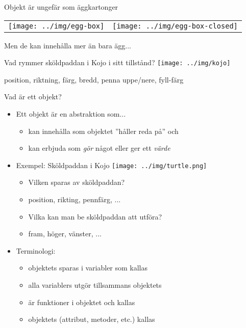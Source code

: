 
\ifkompendium\else
\begin{SlideExtra}{Objekt är ungefär som äggkartonger}
  \begin{tabular}{l r}
    \texttt{[image: ../img/egg-box]}
    &
    \texttt{[image: ../img/egg-box-closed]}
  \end{tabular}
  Men de kan innehålla mer än bara ägg...
\end{SlideExtra}
\fi

\begin{Slide}{Vad rymmer sköldpaddan i Kojo i sitt tillstånd?}
\centering
\texttt{[image: ../img/kojo]}

\pause position, riktning, färg, bredd, penna uppe/nere, fyll-färg
\end{Slide}



\begin{Slide}{Vad är ett objekt?}
\begin{itemize}
\item Ett objekt är en abstraktion som...
\begin{itemize}
  \item kan innehålla  som objektet ''håller reda på'' och
  \item kan erbjuda  som \emph{gör} något eller ger ett \emph{värde}
\end{itemize}

\pause

\item Exempel: Sköldpaddan i Kojo \texttt{[image: ../img/turtle.png]}
\begin{itemize}
  \item Vilken  sparas av sköldpaddan?
  \pause
  \item[] position, rikting, pennfärg, ...

  \item Vilka  kan man be sköldpaddan att utföra?

  \item[] fram, höger, vänster, ...
  \pause


\end{itemize}

\item Terminologi:
\begin{itemize}
  \item objektets  sparas i variabler som kallas 
  \item alla variablers  utgör tillsammans objektets 
  \item {} är funktioner i objektet och kallas 
  \item objektets  (attribut, metoder, etc.) kallas 
\end{itemize}
\end{itemize}
\end{Slide}



